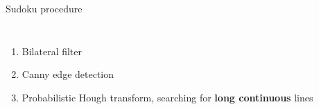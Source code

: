 \documentclass[12pt]{beamer}
\begin{document}
\begin{frame}{Sudoku procedure}
    \begin{columns}
    \begin{enumerate}
        \item<1-> Bilateral filter
        \item<2-> Canny edge detection
        \item<3-> Probabilistic Hough transform, searching for \textbf{long continuous} lines
    \end{enumerate}
\end{columns}
\end{frame}
\end{document}
